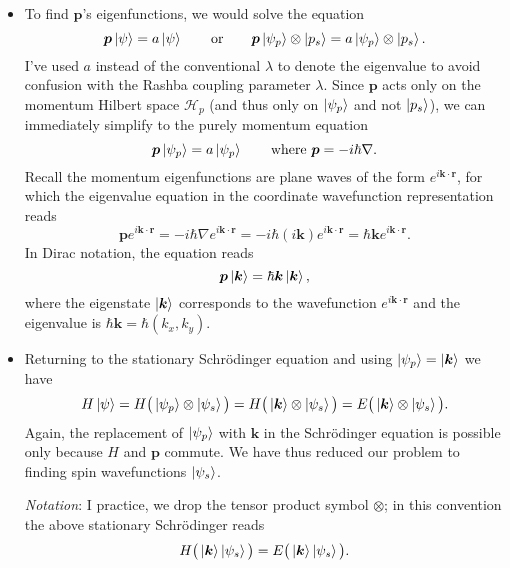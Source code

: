\documentclass[11pt, a4paper]{article}
\newcommand{\eqtext}[1]{\qquad \text{#1} \qquad}
\newcommand{\Schro}{Schr\"{o}dinger\xspace}
\renewcommand{\vec}[1]{\bm{#1}} %
\newcommand{\p}{\psi}  %
\renewcommand{\H}{\mathcal{H}}  %
\renewcommand{\k}{\vec{k}}  %
\begin{document}
\begin{itemize}
	\item To find $ \vec{p} $'s eigenfunctions, we would solve the equation
	\begin{equation*}
		\vec{p} \ket{\p} = a \ket{\p} \eqtext{or} \vec{p}\ket{\p_{p}}\otimes\ket{p_{s}} = a \ket{\p_{p}}\otimes\ket{p_{s}}.
	\end{equation*}
	I've used $ a $ instead of the conventional $ \lambda $ to denote the eigenvalue to avoid confusion with the Rashba coupling parameter $ \lambda $. Since $ \vec{p} $ acts only on the momentum Hilbert space $ \H_{p} $ (and thus only on $ \ket{\p_{p}} $ and not $ \ket{p_{s}} $), we can immediately simplify to the purely momentum equation
	\begin{equation*}
		\vec{p}\ket{\psi_{p}} = a \ket{\psi_{p}} \qquad \text{where } \vec{p} = -i\hbar \nabla.
	\end{equation*}
	Recall the momentum eigenfunctions are plane waves of the form $ e^{i\vec{k}\cdot \vec{r}} $, for which the eigenvalue equation in the coordinate wavefunction representation reads
	\begin{equation*}
		\vec{p} e^{i\vec{k}\cdot \vec{r}} =  -i\hbar \nabla e^{i\vec{k}\cdot \vec{r}}  = -i\hbar (i \vec{k}) e^{i\vec{k}\cdot \vec{r}} = \hbar \vec{k}e^{i\vec{k}\cdot \vec{r}}.
	\end{equation*}
	In Dirac notation, the equation reads
	\begin{equation*}
		\vec{p}\ket{\vec{k}} = \hbar \vec{k} \ket{\vec{k}},
	\end{equation*}
	where the eigenstate $ \ket{\k} $ corresponds to the wavefunction $ e^{i\vec{k}\cdot \vec{r}} $ and the eigenvalue is $ \hbar \vec{k} = \hbar(k_{x}, k_{y}) $.
	
	\item Returning to the stationary \Schro equation and using $ \ket{\psi_{p}} = \ket{\k} $ we have
	\begin{equation*}
		H\ket{\psi} = H\big(\ket{\psi_{p}} \otimes \ket{\psi_{s}}\big) = H\big(\ket{\k} \otimes \ket{\psi_{s}}\big) = E \big(\ket{\k}\otimes \ket{\psi_{s}}\big).
	\end{equation*}
	Again, the replacement of $ \ket{\psi_{p}}$ with $ \k $ in the \Schro equation is possible only because $ H $ and $ \vec{p} $ commute. We have thus reduced our problem to finding spin wavefunctions $ \ket{\psi_{s}} $. 
	
	\textit{Notation}: I practice, we drop the tensor product symbol $ \otimes $; in this convention the above stationary \Schro reads
	\begin{equation*}
		H\big(\ket{\k} \ket{\psi_{s}}\big) = E \big(\ket{\k} \ket{\psi_{s}}\big).
	\end{equation*}
	

\end{itemize}
\end{document}
